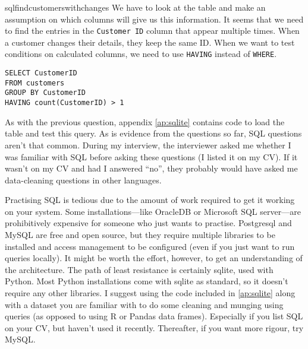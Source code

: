 \begin{answer}{sqlfindcustomerswithchanges}
We have to look at the table and make an assumption on which columns will give us this information.
It seems that we need to find the entries in the \verb+Customer ID+ column that appear multiple times.
When a customer changes their details, they keep the same ID.
When we want to test conditions on calculated columns, we need to use
\verb+HAVING+
instead of
\verb+WHERE+.
\begin{verbatim}
SELECT CustomerID
FROM customers
GROUP BY CustomerID
HAVING count(CustomerID) > 1
\end{verbatim}
As with the previous question, appendix \ref{ap:sqlite} contains code to load the table and test this query.
As is evidence from the questions so far, SQL questions aren't that common.
During my interview, the interviewer asked me whether I was familiar with SQL before asking these questions (I listed it on my CV).
If it wasn't on my CV and had I answered ``no'', they probably would have asked me data-cleaning questions in other languages.

Practising SQL is tedious due to the amount of work required to get it working on your system.
Some installations---like OracleDB or Microsoft SQL server---are prohibitively expensive for someone who just wants to practise.
Postgresql and MySQL are free and open source, but they require multiple libraries to be installed and access management to be configured (even if you just want to run queries locally).
It might be worth the effort, however, to get an understanding of the architecture.
The path of least resistance is certainly sqlite, used with Python.
Most Python installations come with sqlite as standard, so it doesn't require any other libraries.
I suggest using the code included in \ref{ap:sqlite} along with a dataset you are familiar with to do some cleaning and munging using queries (as opposed to using R or Pandas data frames).
Especially if you list SQL on your CV, but haven't used it recently.
Thereafter, if you want more rigour, try MySQL.
\end{answer}
